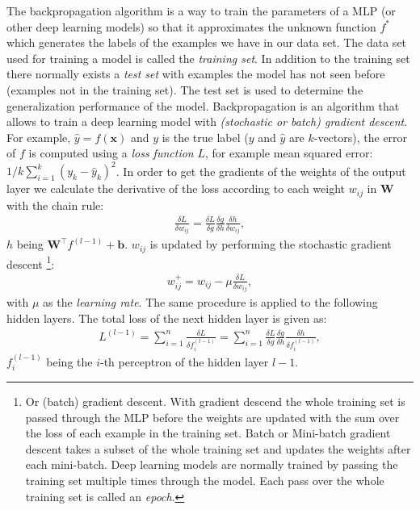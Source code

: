 \documentclass[]{article}
\begin{document}
The backpropagation algorithm is a way to train the parameters of a
MLP (or other deep learning models) so that it approximates the
unknown function $f^*$ which generates the labels of the examples
we have in our data set.
The data set used for training a model is called the \textit{training
set}.
In addition to the training set there normally exists a
\textit{test set} with examples the model has not seen before
(examples not in the training set).
The test set is used to determine the generalization performance of
the model.
Backpropagation is an algorithm that allows to train a deep learning
model with \textit{(stochastic or batch) gradient descent}.
For example, $\hat{y} = f(\mathbf{x})$ and $y$ is the true label
($y$ and $\hat{y}$ are $k$-vectors), the error of $f$ is computed
using a \textit{loss function} $L$, for example mean squared error:
$1/k \sum_{i=1}^{k}(y_k - \hat{y}_k)^2$.
In order to get the gradients of the weights of the output layer
we calculate the derivative of the loss according to each weight
$w_{ij}$ in $\mathbf{W}$ with the chain rule:
\begin{align}
  \frac{\delta L}{\delta w_{ij}} =
    \frac{\delta L}{\delta g}
    \frac{\delta g}{\delta h}
    \frac{\delta h}{\delta w_{ij}},
\end{align}
$h$ being $\mathbf{W}^\top f^{(l-1)} + \mathbf{b}$.
$w_{ij}$ is updated by performing the stochastic gradient descent%
\footnote{Or (batch) gradient descent. With gradient descend the whole
  training set is passed through the MLP before the weights
  are updated with the sum over the loss of each example in the
  training set. Batch or Mini-batch gradient descent takes a subset of
  the whole training set and updates the weights after each
  mini-batch. Deep learning models are normally trained by passing the
  training set multiple times through the model. Each pass over the
  whole training set is called an \textit{epoch}.
}:
\begin{align}
  w_{ij}^+ = w_{ij} - \mu \frac{\delta L}{\delta w_{ij}},
\end{align}
with $\mu$ as the \textit{learning rate}.
The same procedure is applied to the following hidden layers.
The total loss of the next hidden layer is given as:
\begin{align}
  L^{(l-1)} = \sum_{i=1}^n\frac{\delta L}{\delta f^{(l - 1)}_i} =
  \sum_{i=1}^n\frac{\delta L}{\delta g}
    \frac{\delta g}{\delta h}
    \frac{\delta h}{\delta f^{(l - 1)}_i},
\end{align}
$f^{(l-1)}_i$ being the $i$-th perceptron of the hidden layer $l-1$.
\end{document}

